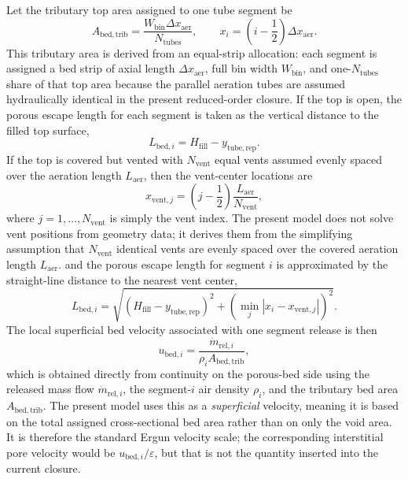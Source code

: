 \documentclass[11pt]{article}
\begin{document}
Let the tributary top area assigned to one tube segment be
\begin{equation}
\label{eq:bed_tributary_area}
A_{\mathrm{bed,trib}}=\frac{W_{\mathrm{bin}}\Delta x_{\mathrm{aer}}}{N_{\mathrm{tubes}}},
\qquad
x_i=\left(i-\frac{1}{2}\right)\Delta x_{\mathrm{aer}}.
\end{equation}
This tributary area is derived from an equal-strip allocation: each segment is assigned a bed strip of axial length \(\Delta x_{\mathrm{aer}}\), full bin width \(W_{\mathrm{bin}}\), and one-\(N_{\mathrm{tubes}}\) share of that top area because the parallel aeration tubes are assumed hydraulically identical in the present reduced-order closure.
If the top is open, the porous escape length for each segment is taken as the vertical distance to the filled top surface,
\begin{equation}
\label{eq:bed_escape_length_open}
L_{\mathrm{bed},i}=H_{\mathrm{fill}}-y_{\mathrm{tube,rep}}.
\end{equation}
If the top is covered but vented with \(N_{\mathrm{vent}}\) equal vents assumed evenly spaced over the aeration length \(L_{\mathrm{aer}}\), then the vent-center locations are
\begin{equation}
\label{eq:vent_centers}
x_{\mathrm{vent},j}=\left(j-\frac{1}{2}\right)\frac{L_{\mathrm{aer}}}{N_{\mathrm{vent}}},
\end{equation}
where \(j=1,\dots,N_{\mathrm{vent}}\) is simply the vent index. The present model does not solve vent positions from geometry data; it derives them from the simplifying assumption that \(N_{\mathrm{vent}}\) identical vents are evenly spaced over the covered aeration length \(L_{\mathrm{aer}}\).
and the porous escape length for segment \(i\) is approximated by the straight-line distance to the nearest vent center,
\begin{equation}
\label{eq:bed_escape_length_vented}
L_{\mathrm{bed},i}=
\sqrt{
\left(H_{\mathrm{fill}}-y_{\mathrm{tube,rep}}\right)^2
+
\left(\min_j\left|x_i-x_{\mathrm{vent},j}\right|\right)^2
}.
\end{equation}
The local superficial bed velocity associated with one segment release is then
\begin{equation}
\label{eq:bed_superficial_velocity}
u_{\mathrm{bed},i}=\frac{\dot m_{\mathrm{rel},i}}{\rho_i A_{\mathrm{bed,trib}}},
\end{equation}
which is obtained directly from continuity on the porous-bed side using the released mass flow \(\dot m_{\mathrm{rel},i}\), the segment-\(i\) air density \(\rho_i\), and the tributary bed area \(A_{\mathrm{bed,trib}}\). The present model uses this as a \emph{superficial} velocity, meaning it is based on the total assigned cross-sectional bed area rather than on only the void area. It is therefore the standard Ergun velocity scale; the corresponding interstitial pore velocity would be \(u_{\mathrm{bed},i}/\varepsilon\), but that is not the quantity inserted into the current closure.
\end{document}
